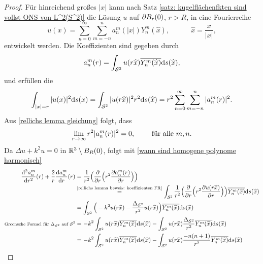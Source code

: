 \begin{proof}
	Für hinreichend großes \(|x|\) kann nach Satz \ref{satz: kugelflächenfkten sind vollst ONS von L^2(S^2)} die Lösung \(u\) auf \(\partial B_r(0)\), \(r>R\), in eine Fourierreihe
	\begin{equation*}
		u(x)=\sum_{n=0}^\infty\sum_{m=-n}^na_n^m(|x|)Y_n^m(\widehat{x}),\qquad\quad\widehat{x}=\frac{x}{|x|},
	\end{equation*}
	entwickelt werden. Die Koeffizienten sind gegeben durch
	\begin{equation}
		\label{rellichs lemma beweis: koeffizienten FR}
		a_n^m(r)=\int_{\mathcal{S}^2}u(r\widehat{x})\overline{Y_n^m(\widehat{x})}\mathrm{d}s(\widehat{x}),
	\end{equation}
	und erfüllen die 
	\begin{equation*}
		\int_{|x|=r}|u(x)|^2\mathrm{d}s(x)=\int_{\mathcal{S}^2}|u(r\widehat{x})|^2r^2\mathrm{d}s(\widehat{x})=r^2\sum_{n=0}^\infty\sum_{m=-n}^n|a_n^m(r)|^2.
	\end{equation*}
	Aus \eqref{rellichs lemma gleichung} folgt, dass
	\begin{equation}
		\label{rellichs lemma beweis: abfall koeffizienten}
		\lim_{r\to\infty}r^2|a_n^m(r)|^2=0,\qquad\text{ für alle }m,n.
	\end{equation}
	Da \(\Delta u+k^2u=0\) in \(\mathbb{R}^3\setminus B_R(0)\), folgt mit \eqref{wann sind homogene polynome harmonisch}
	\begin{align*}
		\frac{\dd^2a_n^m}{\dd r^2}(r)+\frac{2}{r}\frac{\dd a_n^m}{\dr}(r)
		&=\frac{1}{r^2}\Big(\frac{\p}{\p r}\Big(r^2\frac{\p a_n^m(r)}{\p r}\Big)\Big)\\
		&\overset{\scriptsize\eqref{rellichs lemma beweis: koeffizienten FR}}{=}
		\int_{\SS^2}\frac{1}{r^2}\Big(\frac{\p}{\p r}\Big(r^2\frac{\p u(r\widehat{x})}{\p r}\Big)\Big)\overline{Y_n^m(\widehat{x})}\ds(\widehat{x})\\
		&=\int_{\SS^2}\Big(-k^2u(r\widehat{x})-\frac{\Delta_{\SS^2}}{r^2}u(r\widehat{x})\Big)\overline{Y_n^m(\widehat{x})}\ds(\widehat{x})\\
		\te{\scriptsize Greensche Formel für \(\Delta_{\SS^2}\) auf \({\SS^2}\)}
		&=-k^2\int_{\SS^2}u(r\widehat{x})\overline{Y_n^m(\widehat{x})}\ds(\widehat{x}) - \int_{\SS^2}u(r\widehat{x})\frac{\Delta_{\SS^2}}{r^2}\overline{Y_n^m(\widehat{x})}\ds(\widehat{x})\\
		&=-k^2\int_{\SS^2}u(r\widehat{x})\overline{Y_n^m(\widehat{x})}\ds(\widehat{x}) - \int_{\SS^2}u(r\widehat{x})\frac{-n(n+1)}{r^2}\overline{Y_n^m(\widehat{x})}\ds(\widehat{x})\\

\end{align*}
\end{proof}
